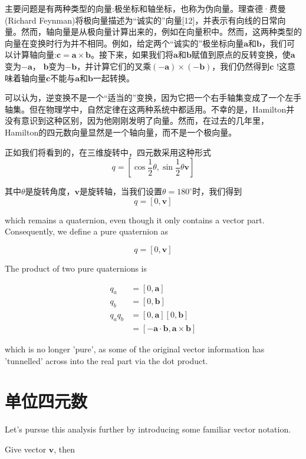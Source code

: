 主要问题是有两种类型的向量:极坐标和轴坐标，也称为伪向量。理查德·费曼(Richard Feynman)将极向量描述为“诚实的”向量[12]，并表示有向线的日常向量。然而，轴向量是从极向量计算出来的，例如在向量积中。然而，这两种类型的向量在变换时行为并不相同。例如，给定两个“诚实的”极坐标向量$\mathbf{a}$和$\mathbf{b}$，我们可以计算轴向量:$\mathbf{c}=\mathbf{a} \times\mathbf{b}$。接下来，如果我们将$\mathbf{a}$和$\mathbf{b}$赋值到原点的反转变换，使$\mathbf{a}$变为$-\mathbf{a}$， $\mathbf{b}$变为$-\mathbf{b}$，并计算它们的叉乘$(-\mathbf{a}) \times(-\mathbf{b})$，我们仍然得到$\mathbf{c}$ !这意味着轴向量$\mathbf{c}$不能与$\mathbf{a}$和$\mathbf{b}$一起转换。

可以认为，逆变换不是一个“适当的”变换，因为它把一个右手轴集变成了一个左手轴集。但在物理学中，自然定律在这两种系统中都适用。不幸的是，Hamilton并没有意识到这种区别，因为他刚刚发明了向量。然而，在过去的几年里，Hamilton的四元数向量显然是一个轴向量，而不是一个极向量。

正如我们将看到的，在三维旋转中，四元数采用这种形式
$$
q=\left[\cos \frac{1}{2} \theta, \sin \frac{1}{2} \theta \mathbf{v}\right]
$$

其中$\theta$是旋转角度，$\mathbf{v}$是旋转轴，当我们设置$\theta=180^{\circ}$时，我们得到
$$
q=[0, \mathbf{v}]
$$

which remains a quaternion, even though it only contains a vector part. Consequently, we define a pure quaternion as

$$
q=[0, \mathbf{v}]
$$

The product of two pure quaternions is

$$
\begin{aligned}
q_{a} & =[0, \mathbf{a}] \\
q_{b} & =[0, \mathbf{b}] \\
q_{a} q_{b} & =[0, \mathbf{a}][0, \mathbf{b}] \\
& =[-\mathbf{a} \cdot \mathbf{b}, \mathbf{a} \times \mathbf{b}]
\end{aligned}
$$

which is no longer 'pure', as some of the original vector information has 'tunnelled' across into the real part via the dot product.

\section{单位四元数}
Let's pursue this analysis further by introducing some familiar vector notation.

Give vector $\mathbf{v}$, then

